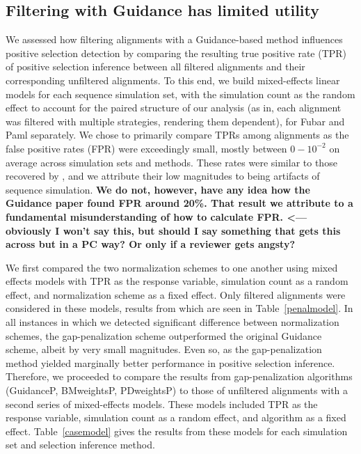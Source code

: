 \documentclass[10pt]{article}
\begin{document}
\subsection*{Filtering with Guidance has limited utility}

We assessed how filtering alignments with a Guidance-based method influences positive selection detection by comparing the resulting true positive rate (TPR) of positive selection inference between all filtered alignments and their corresponding unfiltered alignments. To this end, we build mixed-effects linear models for each sequence simulation set, with the simulation count as the random effect to account for the paired structure of our analysis (as in, each alignment was filtered with multiple strategies, rendering them dependent), for Fubar and Paml separately. 
We chose to primarily compare TPRs among alignments as the false positive rates (FPR) were exceedingly small, mostly between $0-10^{-2}$ on average across simulation sets and methods. These rates were similar to those recovered by \citep{Jordan2011}, and we attribute their low magnitudes to being artifacts of sequence simulation. \textbf{We do not, however, have any idea how the Guidance paper found FPR around 20\%. That result we attribute to a fundamental misunderstanding of how to calculate FPR. <--- obviously I won't say this, but should I say something that gets this across but in a PC way? Or only if a reviewer gets angsty?}

We first compared the two normalization schemes to one another using mixed effects models with TPR as the response variable, simulation count as a random effect, and normalization scheme as a fixed effect. Only filtered alignments were considered in these models, results from which are seen in Table~\ref{penalmodel}. In all instances in which we detected significant difference between normalization schemes, the gap-penalization scheme outperformed the original Guidance scheme, albeit by very small magnitudes. Even so, as the gap-penalization method yielded marginally better performance in positive selection inference. Therefore, we proceeded to compare the results from gap-penalization algorithms (GuidanceP, BMweightsP, PDweightsP) to those of unfiltered alignments with a second series of mixed-effects models. These models included TPR as the response variable, simulation count as a random effect, and algorithm as a fixed effect. Table~\ref{casemodel} gives the results from these models for each simulation set and selection inference method.
\end{document}
